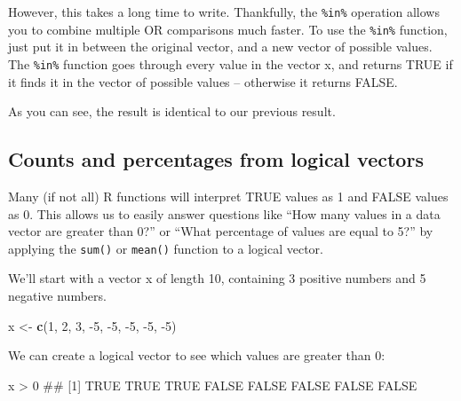 \documentclass[]{book}
\newenvironment{Shaded}{\begin{snugshade}}{\end{snugshade}}
\newcommand{\KeywordTok}[1]{\textcolor[rgb]{0.13,0.29,0.53}{\textbf{{#1}}}}
\newcommand{\DecValTok}[1]{\textcolor[rgb]{0.00,0.00,0.81}{{#1}}}
\newcommand{\StringTok}[1]{\textcolor[rgb]{0.31,0.60,0.02}{{#1}}}
\newcommand{\NormalTok}[1]{{#1}}
\theoremstyle{definition}
\theoremstyle{definition}
\theoremstyle{remark}
\begin{document}
However, this takes a long time to write. Thankfully, the
\texttt{\%in\%} operation allows you to combine multiple OR comparisons
much faster. To use the \texttt{\%in\%} function, just put it in between
the original vector, and a new vector of possible values. The
\texttt{\%in\%} function goes through every value in the vector x, and
returns TRUE if it finds it in the vector of possible values --
otherwise it returns FALSE.

\begin{Shaded}
\end{Shaded}

As you can see, the result is identical to our previous result.

\subsection{Counts and percentages from logical
vectors}\label{counts-and-percentages-from-logical-vectors}

Many (if not all) R functions will interpret TRUE values as 1 and FALSE
values as 0. This allows us to easily answer questions like ``How many
values in a data vector are greater than 0?'' or ``What percentage of
values are equal to 5?'' by applying the \texttt{sum()} or
\texttt{mean()} function to a logical vector.

We'll start with a vector x of length 10, containing 3 positive numbers
and 5 negative numbers.

\begin{Shaded}
\begin{Highlighting}[]
\NormalTok{x <-}\StringTok{ }\KeywordTok{c}\NormalTok{(}\DecValTok{1}\NormalTok{, }\DecValTok{2}\NormalTok{, }\DecValTok{3}\NormalTok{, -}\DecValTok{5}\NormalTok{, -}\DecValTok{5}\NormalTok{, -}\DecValTok{5}\NormalTok{, -}\DecValTok{5}\NormalTok{, -}\DecValTok{5}\NormalTok{)}
\end{Highlighting}
\end{Shaded}

We can create a logical vector to see which values are greater than 0:

\begin{Shaded}
\begin{Highlighting}[]
\NormalTok{x >}\StringTok{ }\DecValTok{0}
\NormalTok{## [1]  TRUE  TRUE  TRUE FALSE FALSE FALSE FALSE FALSE}
\end{Highlighting}
\end{Shaded}
\end{document}
